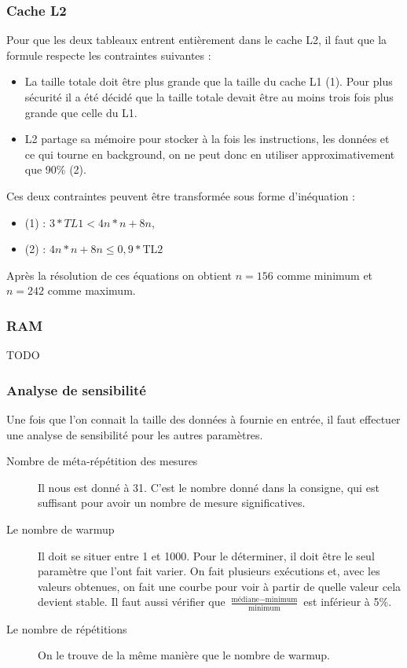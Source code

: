 \documentclass[12pt,a4paper]{article}
\begin{document}
\subsubsection{Cache L2}
Pour que les deux tableaux entrent entièrement dans le cache L2, il faut 
que la formule respecte les contraintes suivantes : 
\begin{itemize}
    \item La taille totale doit être plus grande que la taille du cache 
    L1 (1). Pour plus sécurité il a été décidé que la taille totale devait 
    être au moins trois fois plus grande que celle du L1.
    \item L2 partage sa mémoire pour stocker à la fois les instructions, 
    les données et ce qui tourne en background, on ne peut donc en utiliser 
    approximativement que 90\% (2). 
\end{itemize}

Ces deux contraintes peuvent être transformée sous forme d'inéquation :
\begin{itemize}
    \item (1) : $3*TL1 < 4n*n + 8n$,
    \item (2) : $4n*n + 8n \le 0,9*\text{TL2}$
\end{itemize}
Après la résolution de ces équations on obtient $n=156$ comme minimum et $n=242$
comme maximum.

\subsubsection{RAM}

TODO

\subsubsection{Analyse de sensibilité}

Une fois que l'on connait la taille des données à fournie en entrée, 
il faut effectuer une analyse de sensibilité pour les autres paramètres. 
\begin{description}
    \item[Nombre de méta-répétition des mesures] Il nous est donné à 31. C'est
        le nombre donné dans la consigne, qui est suffisant pour avoir un nombre
        de mesure significatives.
    \item[Le nombre de warmup] Il doit se situer entre 1 et 1000. Pour le
        déterminer, il doit être le seul paramètre que l'ont fait varier. On
        fait plusieurs exécutions et, avec les valeurs obtenues, on fait une
        courbe pour voir à partir de quelle valeur cela devient stable. Il faut
        aussi vérifier que
        $\frac{\text{médiane}-\text{minimum}}{\text{minimum}}$ est inférieur à
        5\%. 
    \item[Le nombre de répétitions] On le trouve de la même manière que le
        nombre de warmup.
\end{description}
\end{document}

